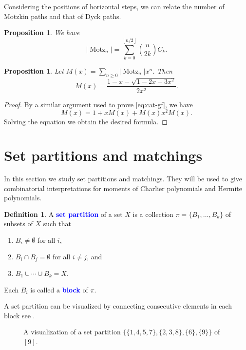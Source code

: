 \documentclass[oneside]{book}
\numberwithin{equation}{section}
\newtheorem{prop}[thm]{Proposition}
\theoremstyle{definition}
\newtheorem{defn}[thm]{Definition}
\newcommand\Motz{\operatorname{Motz}}
\newcommand\flr[1]{\left\lfloor #1\right\rfloor}
\renewcommand\emph[1]{\textcolor{blue}{\bf #1}}
\begin{document}
Considering the positions of horizontal steps, we can relate the
number of Motzkin paths and that of Dyck paths.



\begin{prop}
  We have
  \[
    |\Motz_{n}| = \sum_{k=0}^{\flr{n/2}} \binom{n}{2k} C_k.
  \]
\end{prop}

\begin{prop}
  Let \( M(x) = \sum_{n\ge 0} |\Motz_n| x^n \). Then
  \[
    M(x) = \frac{1-x-\sqrt{1-2x-3x^2}}{2x^2}.
  \]
\end{prop}
\begin{proof}
  By a similar argument used to prove  \eqref{eq:cat-gf},
  we have
  \[
    M(x) = 1 + x M(x) + M(x) x^2 M(x).
  \]
  Solving the equation we obtain the desired formula.
\end{proof}


\section{Set partitions and matchings}

In this section we study set partitions and matchings. They will be
used to give combinatorial interpretations for moments of Charlier
polynomials and Hermite polynomials.

\begin{defn}
  A \emph{set partition} of a set \( X \) is a collection
  \( \pi = \{B_1,\dots,B_k\} \) of subsets of \( X \)
  such that
  \begin{enumerate}
  \item \( B_i\ne\emptyset \) for all \( i \),
  \item \( B_i\cap B_j = \emptyset \) for all \( i\ne j \), and
  \item \( B_1 \cup \cdots \cup B_k = X \).
  \end{enumerate}
  Each \( B_i \) is called a \emph{block} of \( \pi \).
\end{defn}

A set partition can be visualized by connecting consecutive elements
in each block see .

\begin{figure}
  \centering
\caption{A visualization of a set partition
  \( \{\{1,4,5,7\}, \{2,3,8\}, \{6\}, \{9\}\} \) of \( [9] \).}
\label{fig:set-partition}
\end{figure}
\end{document}
